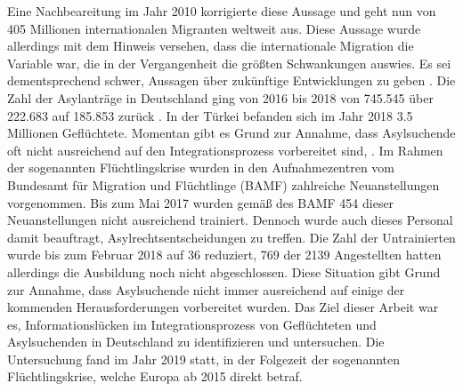 Eine Nachbeareitung im Jahr 2010 korrigierte diese Aussage und geht nun von 405 Millionen internationalen Migranten weltweit aus. Diese Aussage wurde allerdings mit dem Hinweis versehen, dass die internationale Migration die Variable war, die in der Vergangenheit die größten Schwankungen auswies. Es sei dementsprechend schwer, Aussagen über zukünftige Entwicklungen zu geben \citep{migration2018report}.\newline
Die Zahl der Asylantr\"age in Deutschland ging von 2016 bis 2018 von 745.545 \"uber 222.683 auf 185.853 zur\"uck \citep{statistica2019asyl}. In der T\"urkei befanden sich im Jahr 2018 3.5 Millionen Gefl\"uchtete.\newline
\newline
Momentan gibt es Grund zur Annahme, dass Asylsuchende oft nicht ausreichend auf den Integrationsprozess vorbereitet sind\citep{oduntan2017information}, \citep{gillespie2016mapping}.\newline
Im Rahmen der sogenannten Fl\"uchtlingskrise wurden in den Aufnahmezentren vom {Bundesamt f\"ur Migration und Fl\"uchtlinge} (BAMF) zahlreiche Neuanstellungen vorgenommen. Bis zum Mai 2017 wurden gem\"a\ss{} des BAMF 454 dieser Neuanstellungen nicht ausreichend trainiert. Dennoch wurde auch dieses Personal damit beauftragt, Asylrechtsentscheidungen zu treffen.\newline
Die Zahl der Untrainierten wurde bis zum Februar 2018 auf 36 reduziert, 769 der 2139 Angestellten hatten allerdings die Ausbildung noch nicht abgeschlossen.\newline
Diese Situation gibt Grund zur Annahme, dass Asylsuchende nicht immer ausreichend auf einige der kommenden Herausforderungen vorbereitet wurden. \citep{asylum2018bamf}\newline
Das Ziel dieser Arbeit war es, Informationslücken im Integrationsprozess von Geflüchteten und Asylsuchenden in Deutschland zu identifizieren und untersuchen.\newline
Die Untersuchung fand im Jahr 2019 statt, in der Folgezeit der sogenannten Fl\"uchtlingskrise, welche Europa ab 2015 direkt betraf. \citep{unhcr2015seven}\newline


